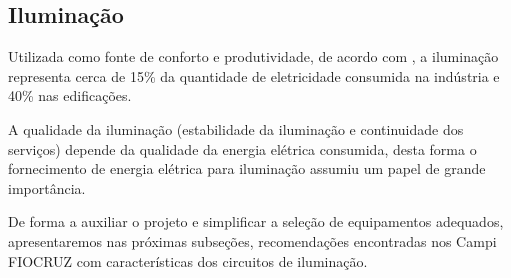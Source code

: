 \subsection{Iluminação} \label{section: lighting}
Utilizada como fonte de conforto e produtividade, de acordo com \cite{SchneiderGuide2015}, a iluminação representa cerca de 15\% da quantidade de eletricidade consumida na indústria e 40\% nas edificações.

A qualidade da iluminação (estabilidade da iluminação e continuidade dos serviços) depende da qualidade da energia elétrica consumida, desta forma o fornecimento de energia elétrica para iluminação assumiu um papel de grande importância.

De forma a auxiliar o projeto e simplificar a seleção de equipamentos adequados, apresentaremos nas próximas subseções, recomendações encontradas nos Campi FIOCRUZ com características dos circuitos de iluminação.





